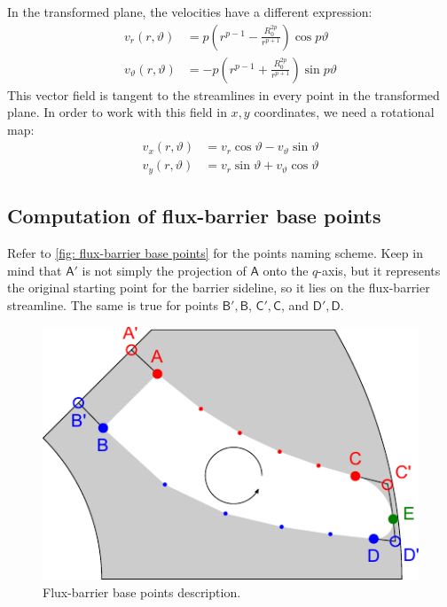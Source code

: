 \documentclass[b5paper,11pt,oneside,fleqn]{article}
\newcommand{\pt}[1]{\mathsf{#1}}
\newcommand{\te}{\vartheta}
\begin{document}
In the transformed plane, the velocities have a different expression:
\begin{equation}
\begin{aligned}
v_r(r,\te)  &=
p \left( r^{p-1} - \frac{R_0^{2p}}{r^{p+1}} \right) \cos p\te \\[1ex]
v_\te(r,\te)  &=
-p \left( r^{p-1} + \frac{R_0^{2p}}{r^{p+1}} \right) \sin p\te
\end{aligned}
\end{equation}
%
This vector field is tangent to the streamlines in every point in the
transformed plane. In order to work with this field in $ x,y $ coordinates, we
need a rotational map:
\begin{equation}
\begin{aligned}
v_x(r,\te) &= v_r \cos\te - v_\te \sin\te \\
v_y(r,\te) &= v_r \sin\te + v_\te \cos\te
\end{aligned}
\end{equation}



\subsection{Computation of flux-barrier base points}

Refer to \autoref{fig: flux-barrier base points} for the points naming scheme.
Keep in mind that $ \pt{A}' $ is not simply the projection of $ \pt{A} $ onto 
the $ q $-axis, but it represents the original starting point for the barrier 
sideline, so it lies on the flux-barrier streamline. The same is true for 
points
$ \pt{B}',\pt{B} $, 
$ \pt{C}',\pt{C} $, and
$ \pt{D}',\pt{D} $.

\begin{figure}[tb]
\centering
\includegraphics[width=0.75\linewidth]{gfx/BarrierPoints/BarrierPoints}
\caption{Flux-barrier base points description.}
\label{fig: flux-barrier base points}
\end{figure}
\end{document}
